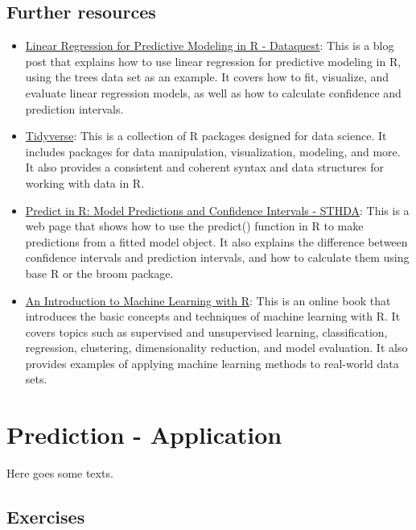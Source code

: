 \documentclass[
]{book}
\providecommand{\tightlist}{%
  \setlength{\itemsep}{0pt}\setlength{\parskip}{0pt}}
\begin{document}
\hypertarget{further-resources-6}{%
\section{Further resources}\label{further-resources-6}}

\begin{itemize}
\tightlist
\item
  \href{https://www.dataquest.io/blog/statistical-learning-for-predictive-modeling-r/}{Linear Regression for Predictive Modeling in R - Dataquest}: This is a blog post that explains how to use linear regression for predictive modeling in R, using the trees data set as an example. It covers how to fit, visualize, and evaluate linear regression models, as well as how to calculate confidence and prediction intervals.
\item
  \href{https://www.tidyverse.org/}{Tidyverse}: This is a collection of R packages designed for data science. It includes packages for data manipulation, visualization, modeling, and more. It also provides a consistent and coherent syntax and data structures for working with data in R.
\item
  \href{http://www.sthda.com/english/articles/40-regression-analysis/166-predict-in-r-model-predictions-and-confidence-intervals/}{Predict in R: Model Predictions and Confidence Intervals - STHDA}: This is a web page that shows how to use the predict() function in R to make predictions from a fitted model object. It also explains the difference between confidence intervals and prediction intervals, and how to calculate them using base R or the broom package.
\item
  \href{https://lgatto.github.io/IntroMachineLearningWithR/}{An Introduction to Machine Learning with R}: This is an online book that introduces the basic concepts and techniques of machine learning with R. It covers topics such as supervised and unsupervised learning, classification, regression, clustering, dimensionality reduction, and model evaluation. It also provides examples of applying machine learning methods to real-world data sets.
\end{itemize}

\hypertarget{pm-a}{%
\chapter{Prediction - Application}\label{pm-a}}

Here goes some texts.

\hypertarget{exercises-1}{%
\section{Exercises}\label{exercises-1}}
\end{document}
